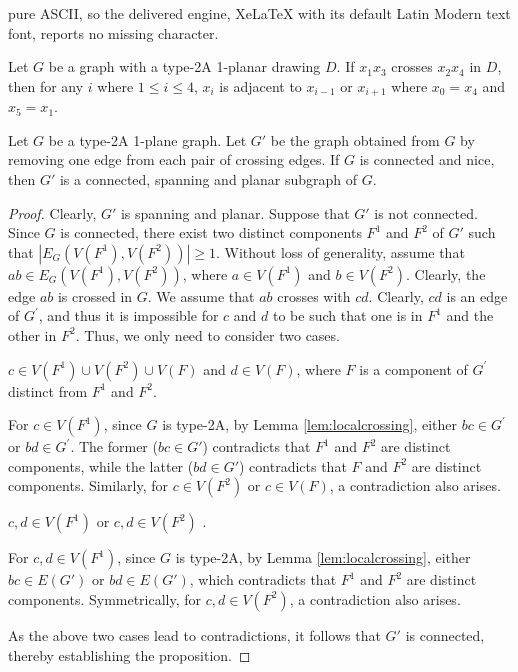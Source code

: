 \documentclass[10pt,a4paper]{amsart}
\begin{document}
pure ASCII, so the delivered engine, XeLaTeX with its default Latin Modern text font, reports no missing character.
\begin{lem}\label{lem:localcrossing}
Let $G$ be a graph with a type-2A 1-planar drawing $D$. If $x_1x_3$ crosses $x_2x_4$ in $D$, then for any $i$ where $1\le i\le 4$, $x_i$ is adjacent to $x_{i-1}$ or $x_{i+1}$ where $x_0=x_4$ and $x_5=x_1$.
\end{lem}

\begin{lem}\label{lem:type3_preserves_connected}
Let $G$ be a type-2A 1-plane graph. Let $G'$ be the graph obtained from $G$ by removing one edge from each pair of crossing edges. If $G$ is connected and nice, then $G'$ is a connected, spanning and planar subgraph of $G$.
\end{lem}

\begin{proof}
 Clearly,  $G'$ is spanning and  planar.  Suppose that $G'$ is not connected.  Since $G$ is connected, there  exist two distinct components $F^1$ and $F^2$ of $G'$ such that  $|E_G(V(F^1),V(F^2))| \ge 1$. Without loss of generality, assume that $ab \in E_G(V(F^1),V(F^2))$, where $a \in V(F^1)$ and $b \in V(F^2)$. Clearly, the edge $a b$ is crossed in $G$. We assume that $a b$ crosses with $c d$. Clearly, $c d$ is an edge of $G^{\prime}$, and thus it is impossible for $c$ and $d$ to be such that one is in $F^1$ and the other in $F^2$. Thus, we only need to consider two cases.



\begin{case} 
$c \in V(F^1)\cup V(F^2) \cup V(F)$  and $d \in V(F)$, where $F$ is a component of $G^{\prime}$ distinct from $F^1$ and $F^2$.
\end{case} 

For $c \in V(F^1)$, since $G$ is type-2A, by Lemma \ref{lem:localcrossing},  either $b c \in G^{\prime}$ or $b d \in G^{\prime}$.  The former ($b c \in G'$) contradicts that $F^1$ and $F^2$ are  distinct components, while the latter ($b d \in G'$) contradicts that $F$ and $F^2$ are  distinct components.  
Similarly, for  $c \in V(F^2)$ or $c\in V(F)$, a contradiction also arises.
 
 

\begin{case} 
 $c,d \in V(F^1)$ or  $c,d \in V(F^2)$ .  
\end{case} 
For $c,d \in V(F^1)$, since $G$ is type-2A,  by Lemma \ref{lem:localcrossing},  either $b c \in E(G')$ or $b d \in E(G')$, which contradicts that $F^1$ and $F^2$ are  distinct components.   Symmetrically, for $c,d \in V(F^2)$, a contradiction also arises. 

As the above two cases lead to contradictions, it follows that $G'$ is connected, thereby establishing the proposition.
\end{proof}
\end{document}
